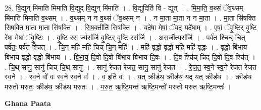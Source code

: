 \documentclass[17pt]{extarticle}
\begin{document}
28. वि॒द्युन् मि॑माति मिमाति वि॒द्युद् वि॒द्युन् मि॑माति । . वि॒द्युदिति॑ वि - द्युत् । . मि॒मा॒ति॒ व॒थ्सं ॅव॒थ्सम् मि॑माति मिमाति व॒थ्सम् । . व॒थ्सम् न न व॒थ्सं ॅव॒थ्सम् न । . न मा॒ता मा॒ता न न मा॒ता । . मा॒ता सि॑षक्ति सिषक्ति मा॒ता मा॒ता सि॑षक्ति । . सि॒ष॒क्तीति॑ सिषक्ति । . यदे॑षा मेषां॒ ॅयद् यदे॑षाम् । . ए॒षां॒ ॅवृ॒ष्टिर् वृ॒ष्टि रे॑षा मेषां ॅवृ॒ष्टिः । . वृ॒ष्टि रस॒ र्ज्यस॑र्जि वृ॒ष्टिर् वृ॒ष्टि रस॑र्जि । . अस॒र्जीत्यस॑र्जि । . पर्व॑त श्चिच् चि॒त् पर्व॑तः॒ पर्व॑त श्चित् । . चि॒न् महि॒ महि॑ चिच् चि॒न् महि॑ । . महि॑ वृ॒द्धो वृ॒द्धो महि॒ महि॑ वृ॒द्धः । . वृ॒द्धो बि॑भाय बिभाय वृ॒द्धो वृ॒द्धो बि॑भाय । . बि॒भा॒य॒ दि॒वो दि॒वो बि॑भाय बिभाय दि॒वः । . दि॒व श्चि॑च् चिद् दि॒वो दि॒व श्चि॑त् । . चि॒थ् सानु॒ सानु॑ चिच् चि॒थ् सानु॑ । . सानु॑ रेजत रेजत॒ सानु॒ सानु॑ रेजत । . रे॒ज॒त॒ स्व॒ने स्व॒ने रे॑जत रेजत स्व॒ने । . स्व॒ने वो॑ वः स्व॒ने स्व॒ने वः॑ । . व॒ इति॑ वः । . यत् क्रीड॑थ॒ क्रीड॑थ॒ यद् यत् क्रीड॑थ । . क्रीड॑थ मरुतो मरुतः॒ क्रीड॑थ॒ क्रीड॑थ मरुतः । . म॒रु॒त॒ ऋ॒ष्टि॒मन्त॑ ऋष्टि॒मन्तो॑ मरुतो मरुत ऋष्टि॒मन्तः॑ । \newline

\textbf{Ghana Paata } \newline
\end{document}
